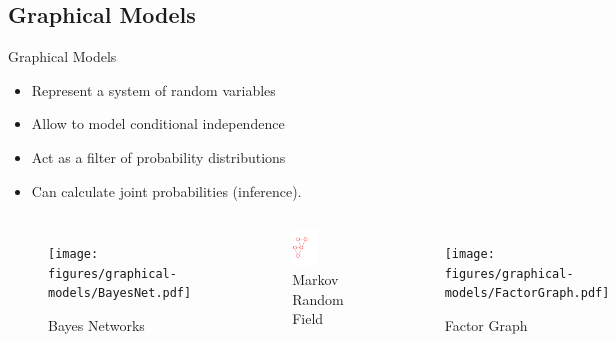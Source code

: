 \documentclass[compress]{beamer}
\begin{document}
\subsection{Graphical Models}

\begin{frame}{Graphical Models}
    \begin{itemize}
        \item Represent a system of random variables
        \item Allow to model conditional independence
        \item Act as a filter of probability distributions
        \item Can calculate joint probabilities (inference).
    \end{itemize}
    \begin{columns}[t]
        \begin{figure}
            \texttt{[image: figures/graphical-models/BayesNet.pdf]}
            \caption{Bayes Networks}
        \end{figure}
        \begin{figure}
            \includegraphics[width=0.5\textwidth]{figures/graphical-models/MarkovRandomField}
            \caption{Markov Random Field}
        \end{figure}
        \begin{figure}
            \texttt{[image: figures/graphical-models/FactorGraph.pdf]}
            \caption{Factor Graph}
        \end{figure}
    \end{columns}
\end{frame}
\end{document}
